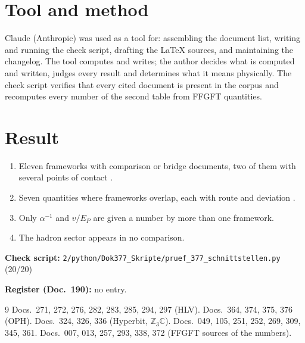 \section*{Tool and method}
Claude (Anthropic) was used as a tool for: assembling the document list,
writing and running the check script, drafting the \LaTeX{} sources, and
maintaining the changelog. The tool computes and writes; the author decides
what is computed and written, judges every result and determines what it means
physically. The check script verifies that every cited document is present in
the corpus and recomputes every number of the second table from FFGFT
quantities.

\section{Result}

\begin{enumerate}
\item Eleven frameworks with comparison or bridge documents, two of them with
  several points of contact \KM.
\item Seven quantities where frameworks overlap, each with route and
  deviation \KM.
\item Only $\alpha^{-1}$ and $v/E_P$ are given a number by more than one
  framework.
\item The hadron sector appears in no comparison.
\end{enumerate}

\medskip
\noindent\textbf{Check script:} \texttt{2/python/Dok377\_Skripte/pruef\_377\_schnittstellen.py} (20/20)

\medskip
\noindent\textbf{Register (Doc.~190):} no entry.

\begin{thebibliography}{9}
 Docs.~271, 272, 276, 282, 283, 285, 294, 297 (HLV).
 Docs.~364, 374, 375, 376 (OPH).
 Docs.~324, 326, 336 (Hyperbit, $\mathbb{Z}_3\mathbb{C}$).
 Docs.~049, 105, 251, 252, 269, 309, 345, 361.
 Docs.~007, 013, 257, 293, 338, 372 (FFGFT sources of the numbers).
\end{thebibliography}
